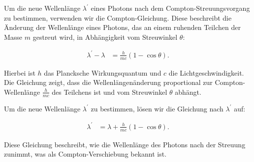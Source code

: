 Um die neue Wellenlänge $\lambda^{\prime}$ eines Photons nach dem Compton-Streuungsvorgang zu bestimmen, verwenden wir die Compton-Gleichung. Diese beschreibt die Änderung der Wellenlänge eines Photons, das an einem ruhenden Teilchen der Masse $m$ gestreut wird, in Abhängigkeit vom Streuwinkel $\theta$:

\begin{align*}
\lambda^{\prime} - \lambda &= \frac{h}{m c} (1 - \cos \theta).
\end{align*}

Hierbei ist $h$ das Plancksche Wirkungsquantum und $c$ die Lichtgeschwindigkeit. Die Gleichung zeigt, dass die Wellenlängenänderung proportional zur Compton-Wellenlänge $\frac{h}{m c}$ des Teilchens ist und vom Streuwinkel $\theta$ abhängt. 

Um die neue Wellenlänge $\lambda^{\prime}$ zu bestimmen, lösen wir die Gleichung nach $\lambda^{\prime}$ auf:

\begin{align*}
\lambda^{\prime} &= \lambda + \frac{h}{m c} (1 - \cos \theta).
\end{align*}

Diese Gleichung beschreibt, wie die Wellenlänge des Photons nach der Streuung zunimmt, was als Compton-Verschiebung bekannt ist.


